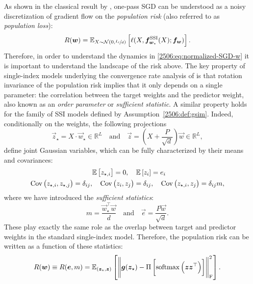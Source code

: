 As shown in the classical result by \cite{chung1954stochastic}, one-pass SGD can be understood as a noisy discretization of gradient flow on the \emph{population risk} (also referred to as \emph{population loss}):
\begin{equation}
    R({\boldsymbol{w}}) =
        \mathbb{E}_{X\sim\mathcal{N}(0,\sfrac{I_d}{d})}\left[\ell(X, {\boldsymbol{f}}^\mathrm{SSI}_{{\boldsymbol{w}}_\star}(X); {\boldsymbol{f}}_{{\boldsymbol{w}}})\right].
\end{equation}
Therefore, in order to understand the dynamics in \cref{2506:eq:normalized-SGD-w} it is important to understand the landscape of the risk above. The key property of single-index models underlying the convergence rate analysis of \cite{arous2021online} is that rotation invariance of the population risk implies that it only depends on a single parameter: the correlation between the target weights and the predictor weight, also known as an \emph{order parameter} or \emph{sufficient statistic}. A similar property holds for the family of SSI models defined by Assumption~\ref{2506:def:gsim}. Indeed, conditionally on the weights, the following projections
\begin{equation}
    \vec{z}_\star = X\cdot \vec{w}_\star \in \mathbb{R}^L
    \quad \text{and} \quad
    \vec{z} = \left(X+\frac{P}{\sqrt{d}}\right)\vec{w} \in \mathbb{R}^L,
\end{equation}
define joint Gaussian variables, which can be fully characterized by their means and covariances:
\begin{equation}\begin{split}\label{2506:eq:localfields_joint_distribution}
    &\mathbb{E}\left[z_{\star,i}\right] = 0, \quad \mathbb{E}\left[z_{i}\right] = e_i \\
    \operatorname{Cov}\left(z_{\star,i}, z_{\star,j}\right) = \delta_{ij}, &\quad
    \operatorname{Cov}\left(z_{i}, z_{j}\right) = \delta_{ij}, \quad
    \operatorname{Cov}\left(z_{\star,i}, z_{j}\right) = \delta_{ij} m,
\end{split}\end{equation}
where we have introduced the \emph{sufficient statistics}:
\begin{equation}
    m = \frac{\vec{w}_\star^\top\vec{w}}{d}
    \quad \text{and} \quad
    \vec{e} = \frac{P\vec{w}}{\sqrt{d}}.
\end{equation}
These play exactly the same role as the overlap between target and predictor weights in the standard single-index model. Therefore, the population risk can be written as a function of these statistics:
\begin{equation} \label{2506:eq:population-loss_sufficient-statistic}
    R({\boldsymbol{w}}) \equiv R({\boldsymbol{e}}, m) =
        \mathbb{E}_{({\boldsymbol{z}}_\star, {\boldsymbol{z}})}\left[
            \left\lVert {\boldsymbol{g}}({\boldsymbol{z}}_\star) - \Pi\left[\operatorname{softmax}{\left({\boldsymbol{z}}{\boldsymbol{z}}^\top\right)}\right]\right\rVert^2_{\rm F}
        \right].
\end{equation}
